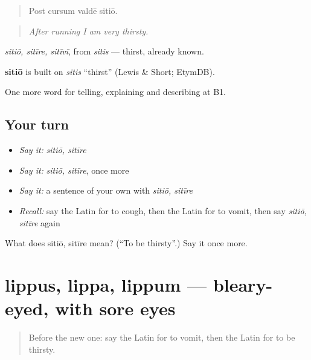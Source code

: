 \begin{quote}
Post cursum valdē sitiō.
\end{quote}

\begin{quote}
\emph{After running I am very thirsty.}
\end{quote}

\emph{sitiō, sitīre, sitīvī}, from \emph{sitis} — thirst, already known.

\begin{cousinweb}
\textbf{sitiō} is built on \emph{sitis} \textquotedblleft{}thirst\textquotedblright{} (Lewis \& Short; EtymDB).
\end{cousinweb}

\begin{grammarlens}[title={What you've built}]
One more word for telling, explaining and describing at B1.
\end{grammarlens}

\subsection*{Your turn}
\begin{itemize}
\raggedright
  \item \emph{Say it:} \emph{sitiō, sitīre}
  \item \emph{Say it:} \emph{sitiō, sitīre}, once more
  \item \emph{Say it:} a sentence of your own with \emph{sitiō, sitīre}
  \item \emph{Recall:} say the Latin for to cough, then the Latin for to vomit, then say \emph{sitiō, sitīre} again
\end{itemize}

\begin{tcolorbox}[breakable,colback=teal!4,colframe=teal!35!black,title={Before you move on}]
What does sitiō, sitīre mean? (\textquotedblleft{}To be thirsty\textquotedblright{}.) Say it once more.
\end{tcolorbox}
\section[lippus, lippa, lippum]{lippus, lippa, lippum — bleary-eyed, with sore eyes}

\label{lesson:LA-C525-lippus}



\begin{quote}
Before the new one: say the Latin for to vomit, then the Latin for to be thirsty.
\end{quote}

